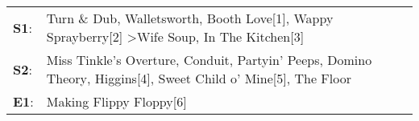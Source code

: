 \begin{supertabular}{p{0.03\textwidth}p{0.92\textwidth}}
 \textbf{S1}:  &                                   Turn \& Dub\textsuperscript{}, \enspace Walletsworth\textsuperscript{}, \enspace Booth Love[1]\textsuperscript{}, \enspace Wappy Sprayberry[2]\textsuperscript{} \textgreater \enspace Wife Soup\textsuperscript{}, \enspace In The Kitchen[3]\textsuperscript{}  \enspace  \\
 \textbf{S2}:  &  Miss Tinkle's Overture\textsuperscript{}, \enspace Conduit\textsuperscript{}, \enspace Partyin' Peeps\textsuperscript{}, \enspace Domino Theory\textsuperscript{}, \enspace Higgins[4]\textsuperscript{}, \enspace Sweet Child o' Mine[5]\textsuperscript{}, \enspace The Floor\textsuperscript{}  \enspace  \\
 \textbf{E1}:  &                                                                                                                                                                                                                                                          Making Flippy Floppy[6]\textsuperscript{}  \enspace  \\
\end{supertabular}
